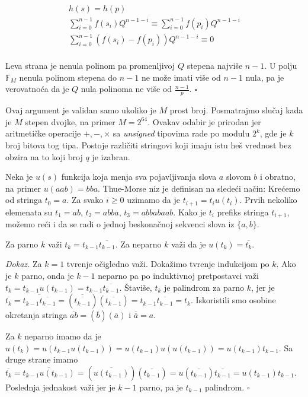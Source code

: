 \begin{gather*}
h(s) = h(p) \\
\sum_{i=0}^{n-1}f(s_i)Q^{n-1-i} \equiv  \sum_{i=0}^{n-1}f(p_i)Q^{n-1-i} \\
\sum_{i=0}^{n-1}(f(s_i)-f(p_i))Q^{n-1-i} \equiv 0 \\
\end{gather*}

Leva strana je nenula polinom pa promenljivoj $Q$ stepena najvi\v se $n-1$. U polju $\mathbb{F}_M$ nenula polinom stepena do $n-1$ ne mo\v ze imati vi\v se od $n-1$ nula, pa je verovatno\' ca da je $Q$ nula polinoma ne vi\v se od $\frac{n-1}{p}$. \hfill $\square$

Ovaj argument je validan samo ukoliko je $M$ prost broj. Posmatrajmo slu\v caj kada je $M$ stepen dvojke, na primer $M = 2^{64}$. Ovakav odabir je prirodan jer aritmeti\v cke operacije $+,-,\times$ sa \textit{unsigned} tipovima rade po modulu $2^k$, gde je $k$ broj bitova tog tipa. Postoje razli\v citi stringovi koji imaju istu he\v s vrednost bez obzira na to koji broj $q$ je izabran.

Neka je $u(s)$ funkcija koja menja sva pojavljivanja slova $a$ slovom $b$ i obratno, na primer $u(aab) = bba$. Thue-Morse niz\cite{thuemorserad} je definisan na slede\' ci na\v cin: Kre\' cemo od stringa $t_0 = a$. Za svako $i \geq 0$ uzimamo da je $t_{i+1} = t_iu(t_i)$. Prvih nekoliko elemenata su $t_1 = ab$, $t_2 = abba$, $t_3 = abbabaab$. Kako je $t_i$ prefiks stringa $t_{i+1}$, mo\v zemo re\' ci i da se radi o jednoj beskona\v cnoj sekvenci slova iz $\{a,b\}$.

\begin{thm}
\label{thuemorseosobina}
Za parno $k$ va\v zi $t_k = t_{k-1}\overline{t_{k-1}}$. Za neparno $k$ va\v zi da je $u(t_{k}) = \overline{t_{k}}$.
\end{thm}

\textit{Dokaz.} Za $k=1$ tvr\dj enje o\v cigledno va\v zi. Doka\v zimo tvr\dj enje indukcijom po $k$. Ako je $k$ parno, onda je $k-1$ neparno pa po induktivnoj pretpostavci va\v zi $t_k = t_{k-1}u(t_{k-1}) = t_{k-1}\overline{t_{k-1}}$. \v Stavi\v se, $t_k$ je palindrom za parno $k$, jer je $\overline{t_k} = \overline{t_{k-1}\overline{t_{k-1}}} = (\overline{\overline{t_{k-1}}})(\overline{t_{k-1}}) = t_{k-1}\overline{t_{k-1}} = t_k$. Iskoristili smo osobine okretanja stringa $\overline{ab} = (\overline{b})(\overline{a})$ i $\overline{\overline{a}} = a$.

Za $k$ neparno imamo da je $u(t_{k}) = u(t_{k-1}u(t_{k-1})) = u(t_{k-1})u(u(t_{k-1})) = u(t_{k-1})t_{k-1}$. Sa druge strane imamo $\overline{t_k} = \overline{t_{k-1}u(t_{k-1})} = (\overline{u(t_{k-1})})(\overline{t_{k-1}}) = u(\overline{t_{k-1}})\overline{t_{k-1}} = u(t_{k-1})t_{k-1}$. Poslednja jednakost va\v zi jer je $k-1$ parno, pa je $t_{k-1}$ palindrom. \hfill $\square$

